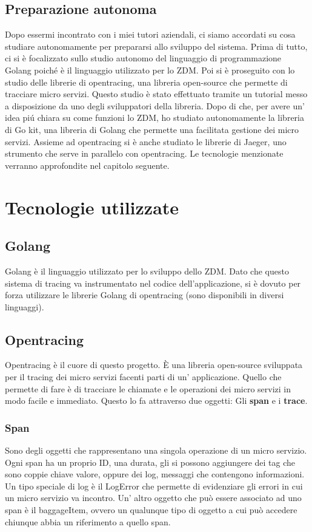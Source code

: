 \documentclass[a4paper,12pt,titlepage,italian,openany]{report}
\begin{document}
\section{Preparazione autonoma}
Dopo essermi incontrato con i miei tutori aziendali, ci siamo accordati su cosa studiare autonomamente per prepararsi allo sviluppo del sistema.
Prima di tutto, ci si è focalizzato  sullo studio autonomo del linguaggio di programmazione Golang poiché è il linguaggio utilizzato per lo ZDM\cite{zdm:1}.
Poi si è proseguito con lo studio delle librerie di opentracing, una libreria open-source che permette di tracciare micro servizi.
Questo studio è stato effettuato tramite un tutorial\cite{opentracing:2} messo a disposizione da uno degli sviluppatori della libreria. Dopo di che, per avere un' idea piú chiara su come funzioni lo ZDM,
ho studiato autonomamente la libreria di Go kit\cite{go:2}, una libreria di Golang che permette una facilitata gestione dei micro servizi.
Assieme ad opentracing si è anche studiato le librerie di Jaeger\cite{jaeger:1}, uno strumento che serve in parallelo con opentracing.
Le tecnologie menzionate verranno approfondite nel capitolo seguente.
\chapter{Tecnologie utilizzate}
\section{Golang}
Golang\cite{go:1} è il linguaggio utilizzato per lo sviluppo dello ZDM. Dato che questo sistema di tracing va instrumentato nel codice dell'applicazione, si è dovuto per forza utilizzare le librerie
Golang di opentracing (sono disponibili in diversi linguaggi).
\section{Opentracing}
Opentracing\cite{opentracing:1} è il cuore di questo progetto. È una libreria open-source sviluppata per il tracing dei micro servizi facenti parti di un' applicazione.
Quello che permette di fare è di tracciare le chiamate e le operazioni dei micro servizi in modo facile e immediato.
Questo lo fa attraverso due oggetti: Gli \textbf{span} e i \textbf{trace}.\\
\subsection{Span}
Sono degli oggetti che rappresentano una singola operazione di un micro servizio. Ogni span ha un proprio ID, una durata, 
gli si possono aggiungere dei tag che sono coppie chiave valore, oppure dei log, messaggi che contengono informazioni. Un tipo speciale di log è il LogError che permette
di evidenziare gli errori in cui un micro servizio va incontro. Un' altro oggetto che può essere associato ad uno span è il baggageItem, ovvero un qualunque tipo di oggetto a cui può accedere chiunque abbia un riferimento a quello span.
\end{document}
